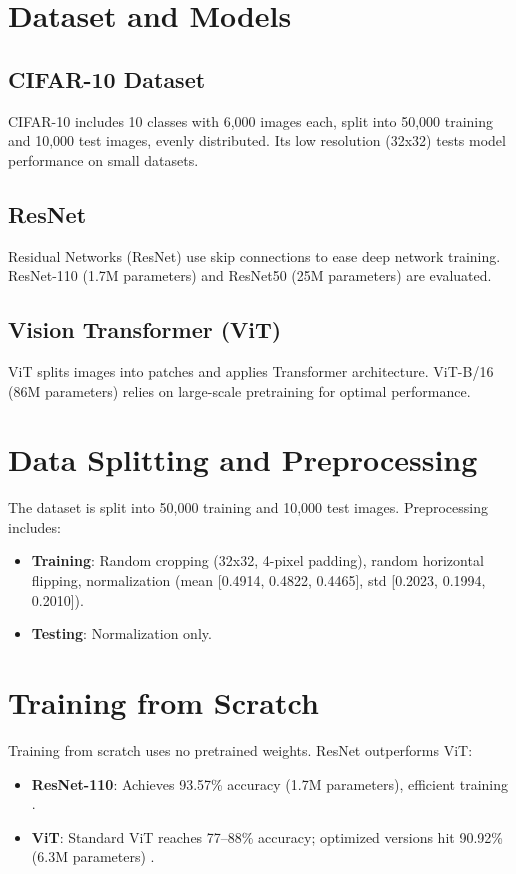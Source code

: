 \documentclass[UTF8]{report}
\theoremstyle{MyLineTheoremStyle} %
\theoremstyle{MyBlockTheoremStyle} %
\theoremstyle{MySubsubsectionStyle} %
\begin{document}
\section*{Dataset and Models}
\subsection*{CIFAR-10 Dataset}
CIFAR-10 includes 10 classes with 6,000 images each, split into 50,000 training and 10,000 test images, evenly distributed. Its low resolution (32x32) tests model performance on small datasets.

\subsection*{ResNet}
Residual Networks (ResNet) use skip connections to ease deep network training. ResNet-110 (1.7M parameters) and ResNet50 (25M parameters) are evaluated.

\subsection*{Vision Transformer (ViT)}
ViT splits images into patches and applies Transformer architecture. ViT-B/16 (86M parameters) relies on large-scale pretraining for optimal performance.

\section*{Data Splitting and Preprocessing}
The dataset is split into 50,000 training and 10,000 test images. Preprocessing includes:
\begin{itemize}
    \item \textbf{Training}: Random cropping (32x32, 4-pixel padding), random horizontal flipping, normalization (mean [0.4914, 0.4822, 0.4465], std [0.2023, 0.1994, 0.2010]).
    \item \textbf{Testing}: Normalization only.
\end{itemize}

\section*{Training from Scratch}
Training from scratch uses no pretrained weights. ResNet outperforms ViT:
\begin{itemize}
    \item \textbf{ResNet-110}: Achieves 93.57\% accuracy (1.7M parameters), efficient training \cite{he2016deep}.
    \item \textbf{ViT}: Standard ViT reaches 77–88\% accuracy; optimized versions hit 90.92\% (6.3M parameters) \cite{omihub777vitcifar, kentaroy47vit}.
\end{itemize}
\end{document}
